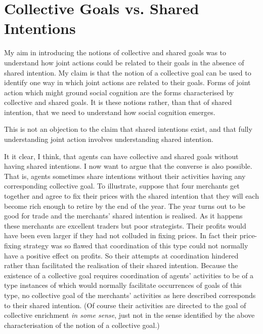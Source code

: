 \documentclass[12pt,a4paper]{extarticle}
\begin{document}
\section{Collective Goals vs. Shared Intentions}
My aim in  introducing the notions of collective and shared goals was to understand how joint actions could be related to their goals in the absence of shared intention.  
My claim is that the notion of a collective goal can be used to identify one way in which joint actions are related to their goals.  
Forms of joint action which might ground social cognition are the forms characterised by collective and shared goals.
It is these notions rather, than that of shared intention, that we need to understand how social cognition emerges.

This is not an objection to the claim that shared intentions exist, and that fully understanding joint action involves understanding shared intention.

It it clear, I think, that agents can have collective and shared goals without having shared intentions.
I now want to argue that the converse is also possible.
That is, agents sometimes share intentions without their activities having any corresponding collective goal.  
To illustrate, suppose that four merchants get together and agree to fix their prices with the shared intention that they will each become rich enough to retire by the end of the year.  
The year turns out to be good for trade and the merchants'  shared intention is realised.
As it happens these merchants are excellent traders but poor strategists.
Their profits would have been even larger if they had not colluded in fixing prices.
In fact their price-fixing strategy was so flawed that coordination of this type could not normally have a positive effect on profits.
So their attempts at coordination hindered rather than facilitated the realisation of their shared intention.  
Because the existence of a collective goal requires coordination of agents' activities to be of a type instances of which would normally facilitate occurrences of  goals of this type, no collective goal of the merchants' activities as here described corresponds to their shared intention.
(Of course their activities are directed to the goal of collective enrichment \emph{in some sense}, just not in the sense identified by the above characterisation of the notion of a collective goal.)
\end{document}

